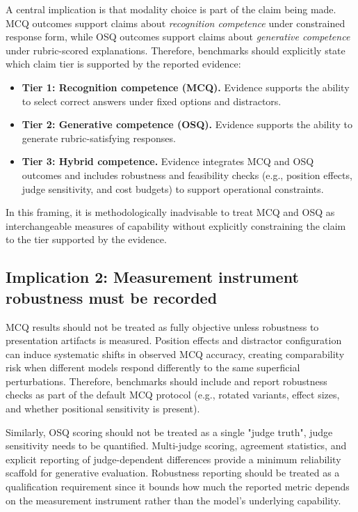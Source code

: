 A central implication is that modality choice is part of the claim being made. MCQ outcomes support claims about \emph{recognition competence} under constrained response form, while OSQ outcomes support claims about \emph{generative competence} under rubric-scored explanations. Therefore, benchmarks should explicitly state which claim tier is supported by the reported evidence:
\begin{itemize}
    \item \textbf{Tier 1: Recognition competence (MCQ).} Evidence supports the ability to select correct answers under fixed options and distractors.
    \item \textbf{Tier 2: Generative competence (OSQ).} Evidence supports the ability to generate rubric-satisfying responses.
    \item \textbf{Tier 3: Hybrid competence.} Evidence integrates MCQ and OSQ outcomes and includes robustness and feasibility checks (e.g., position effects, judge sensitivity, and cost budgets) to support operational constraints. 
\end{itemize}

In this framing, it is methodologically inadvisable to treat MCQ and OSQ as interchangeable measures of capability without explicitly constraining the claim to the tier supported by the evidence.

\subsection{Implication 2: Measurement instrument robustness must be recorded}
\label{subsec:ch5_imp_instrument_robustness}

MCQ results should not be treated as fully objective unless robustness to presentation artifacts is measured. Position effects and distractor configuration can induce systematic shifts in observed MCQ accuracy, creating comparability risk when different models respond differently to the same superficial perturbations. Therefore, benchmarks should include and report robustness checks as part of the default MCQ protocol (e.g., rotated variants, effect sizes, and whether positional sensitivity is present). 

Similarly, OSQ scoring should not be treated as a single "judge truth", judge sensitivity needs to be quantified. Multi-judge scoring, agreement statistics, and explicit reporting of judge-dependent differences provide a minimum reliability scaffold for generative evaluation. Robustness reporting should be treated as a qualification requirement since it bounds how much the reported metric depends on the measurement instrument rather than the model's underlying capability.

